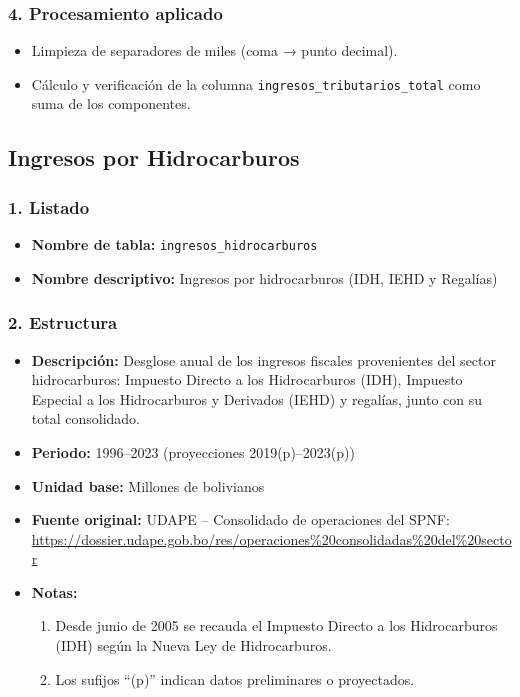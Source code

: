 \documentclass[12pt,a4paper]{article}
\begin{document}
\subsubsection*{4. Procesamiento aplicado}
\begin{itemize}
  \item Limpieza de separadores de miles (coma → punto decimal).
  \item Cálculo y verificación de la columna \texttt{ingresos\_tributarios\_total} como suma de los componentes.
\end{itemize}
\subsection{Ingresos por Hidrocarburos}

\subsubsection*{1. Listado}
\begin{itemize}
  \item \textbf{Nombre de tabla:} \texttt{ingresos\_hidrocarburos}
  \item \textbf{Nombre descriptivo:} Ingresos por hidrocarburos (IDH, IEHD y Regalías)
\end{itemize}

\subsubsection*{2. Estructura}
\begin{itemize}
  \item \textbf{Descripción:} Desglose anual de los ingresos fiscales provenientes del sector hidrocarburos: Impuesto Directo a los Hidrocarburos (IDH), Impuesto Especial a los Hidrocarburos y Derivados (IEHD) y regalías, junto con su total consolidado.
  \item \textbf{Periodo:} 1996–2023 (proyecciones 2019(p)–2023(p))
  \item \textbf{Unidad base:} Millones de bolivianos
  \item \textbf{Fuente original:} UDAPE – Consolidado de operaciones del SPNF:\\
    \url{https://dossier.udape.gob.bo/res/operaciones%20consolidadas%20del%20sector}
  \item \textbf{Notas:}
    \begin{enumerate}
      \item Desde junio de 2005 se recauda el Impuesto Directo a los Hidrocarburos (IDH) según la Nueva Ley de Hidrocarburos.
      \item Los sufijos “(p)” indican datos preliminares o proyectados.
    \end{enumerate}
\end{itemize}
\end{document}
